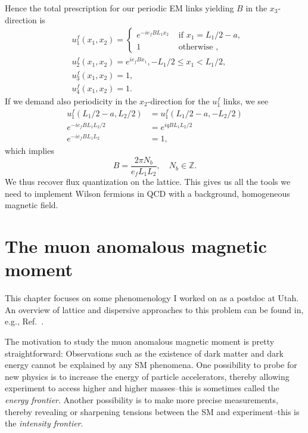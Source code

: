 Hence the total prescription for our periodic EM links yielding $B$ in the
$x_3$-direction is
\begin{equation}
\begin{aligned}
& u_1^f\left(x_1, x_2\right)= \begin{cases}e^{-i e_f B L_1 x_2} & \text { if } x_1=L_1 / 2-a, \\
1 & \text { otherwise },\end{cases} \\
& u_2^f\left(x_1, x_2\right)=e^{i e_f B x_1},-L_1 / 2 \leq x_1<L_1 / 2, \\
& u_3^f\left(x_1, x_2\right)=1, \\
& u_4^f\left(x_1, x_2\right)=1 .
\end{aligned}
\end{equation}
If we demand also periodicity in the $x_2$-direction for the $u_1^f$ links, we
see
\begin{equation}
\begin{aligned}
u^f_1\left(L_1 / 2-a, L_2 / 2\right) & =u^f_1\left(L_1 / 2-a,-L_2 / 2\right) \\
e^{-i e_f B L_1 L_2 / 2} & =e^{i q B L_1 L_2 / 2} \\
e^{-i e_f B L_1 L_2} & =1,
\end{aligned}
\end{equation}
which implies
\begin{equation}
B=\frac{2 \pi N_b}{e_f L_1 L_2}, \quad N_b \in \mathbb{Z} .
\end{equation}
We thus recover flux quantization on the lattice.
This gives us all the tools we need to implement Wilson fermions in QCD with a
background, homogeneous magnetic field.


\section{The muon anomalous magnetic moment}\label{sec:muonAnom}

This chapter focuses on some phenomenology I worked on as a postdoc at Utah.
An overview of lattice and dispersive approaches to this problem can
be found in, e.g., Ref.~\cite{aoyama_anomalous_2020}.

The motivation to study the muon anomalous magnetic moment is pretty
straightforward: Observations such as the existence of dark matter and
dark energy cannot be explained by any SM phenomena. One possibility to probe
for new physics is to increase the energy of particle accelerators, thereby
allowing experiment to access higher and higher masses--this is sometimes
called the {\it energy frontier}.
Another possibility is to make more precise measurements, thereby revealing or
sharpening tensions between the SM and experiment--this is
the {\it intensity frontier}.

